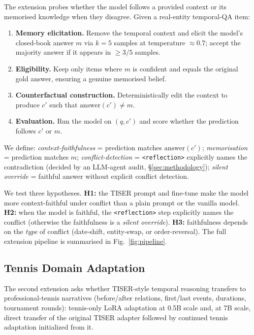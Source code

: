 \documentclass[conference]{IEEEtran}
\begin{document}
The extension probes whether the model follows a provided context or its memorised knowledge when they disagree. Given a real-entity temporal-QA item:
\begin{enumerate}
\item \textbf{Memory elicitation.} Remove the temporal context and elicit the model's closed-book answer $m$ via $k{=}5$ samples at temperature ${\approx}0.7$; accept the majority answer if it appears in ${\geq}3/5$ samples.
\item \textbf{Eligibility.} Keep only items where $m$ is confident and equals the original gold answer, ensuring a genuine memorised belief.
\item \textbf{Counterfactual construction.} Deterministically edit the context to produce $c'$ such that $\text{answer}(c') \neq m$.
\item \textbf{Evaluation.} Run the model on $(q, c')$ and score whether the prediction follows $c'$ or $m$.
\end{enumerate}

We define:
\emph{context-faithfulness} = prediction matches $\text{answer}(c')$;
\emph{memorisation} = prediction matches $m$;
\emph{conflict-detection} = \texttt{<reflection>} explicitly names the contradiction (decided by an LLM-agent audit, \S\ref{sec:methodology});
\emph{silent override} = faithful answer without explicit conflict detection.

We test three hypotheses. \textbf{H1:} the TISER prompt and fine-tune make the model more context-faithful under conflict than a plain prompt or the vanilla model. \textbf{H2:} when the model is faithful, the \texttt{<reflection>} step explicitly names the conflict (otherwise the faithfulness is a \emph{silent override}). \textbf{H3:} faithfulness depends on the \emph{type} of conflict (date-shift, entity-swap, or order-reversal). The full extension pipeline is summarised in Fig.~\ref{fig:pipeline}.

\subsection{Tennis Domain Adaptation}

The second extension asks whether TISER-style temporal reasoning transfers to professional-tennis narratives (before/after relations, first/last events, durations, tournament rounds): tennis-only LoRA adaptation at 0.5B scale and, at 7B scale, direct transfer of the original TISER adapter followed by continued tennis adaptation initialized from it.
\end{document}
